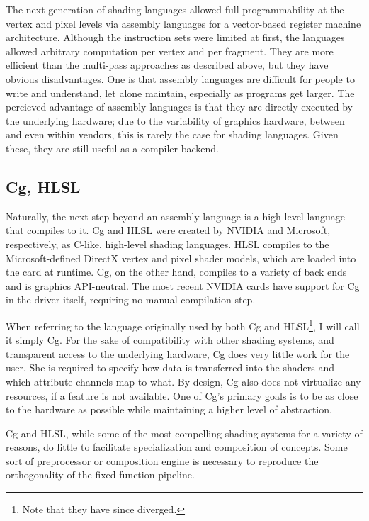 \documentclass{acmsiggraph}               %
\begin{document}
The next generation of shading languages allowed full programmability
at the vertex and pixel levels via assembly languages for a
vector-based register machine architecture.  Although the instruction
sets were limited at first, the languages allowed arbitrary
computation per vertex and per fragment.  They are more efficient than
the multi-pass approaches as described above, but they have obvious
disadvantages.  One is that assembly languages are difficult for
people to write and understand, let alone maintain, especially as
programs get larger.  The percieved advantage of assembly languages is
that they are directly executed by the underlying hardware; due to the
variability of graphics hardware, between and even within vendors,
this is rarely the case for shading languages.  Given these, they are
still useful as a compiler backend.


\subsection{Cg, HLSL}

Naturally, the next step beyond an assembly language is a high-level
language that compiles to it.  Cg \cite{mark03cg} and HLSL were
created by NVIDIA and Microsoft, respectively, as C-like, high-level
shading languages.  HLSL compiles to the Microsoft-defined DirectX
vertex and pixel shader models, which are loaded into the card at
runtime.  Cg, on the other hand, compiles to a variety of back ends
and is graphics API-neutral.  The most recent NVIDIA cards have
support for Cg in the driver itself, requiring no manual compilation
step.

When referring to the language originally used by both Cg and
HLSL\footnote{Note that they have since diverged.}, I will call it
simply Cg.  For the sake of compatibility with other shading systems,
and transparent access to the underlying hardware, Cg does very little
work for the user. She is required to specify how data is transferred
into the shaders and which attribute channels map to what. By design,
Cg also does not virtualize any resources, if a feature is not
available.  One of Cg's primary goals is to be as close to the
hardware as possible while maintaining a higher level of abstraction.

Cg and HLSL, while some of the most compelling shading systems for a
variety of reasons, do little to facilitate specialization and
composition of concepts.  Some sort of preprocessor or composition
engine is necessary to reproduce the orthogonality of the fixed
function pipeline.
\end{document}
